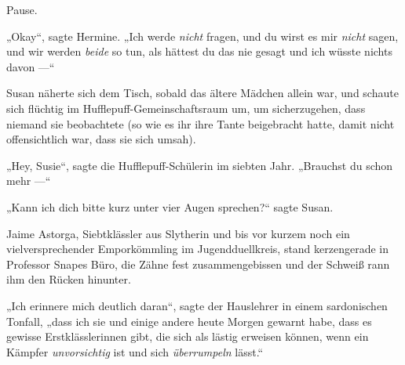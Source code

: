 Pause.

„Okay“, sagte Hermine.
„Ich werde \emph{nicht} fragen, und du wirst es mir \emph{nicht} sagen, und wir werden \emph{beide} so tun, als hättest du das nie gesagt und ich wüsste nichts davon —“

\later

Susan näherte sich dem Tisch, sobald das ältere Mädchen allein war, und schaute sich flüchtig im Hufflepuff-Gemeinschaftsraum um, um sicherzugehen, dass niemand sie beobachtete (so wie es ihr ihre Tante beigebracht hatte, damit nicht offensichtlich war, dass sie sich umsah).

„Hey, Susie“, sagte die Hufflepuff-Schülerin im siebten Jahr.
„Brauchst du schon mehr —“

„Kann ich dich bitte kurz unter vier Augen sprechen?“ sagte Susan.

\later

Jaime Astorga, Siebtklässler aus Slytherin und bis vor kurzem noch ein vielversprechender Emporkömmling im Jugendduellkreis, stand kerzengerade in Professor Snapes Büro, die Zähne fest zusammengebissen und der Schweiß rann ihm den Rücken hinunter.

„Ich erinnere mich deutlich daran“, sagte der Hauslehrer in einem sardonischen Tonfall, „dass ich sie und einige andere heute Morgen gewarnt habe, dass es gewisse Erstklässlerinnen gibt, die sich als lästig erweisen können, wenn ein Kämpfer \emph{unvorsichtig} ist und sich \emph{überrumpeln} lässt.“

